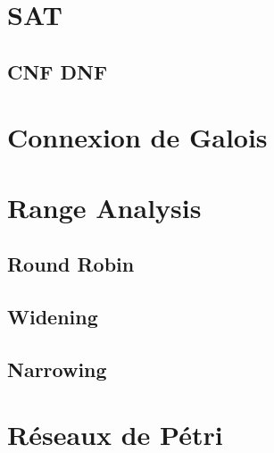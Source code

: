 \documentclass{article}
\begin{document}
  \section{SAT}
  \subsection{CNF DNF}

  \section{Connexion de Galois}
  \subsection{}

  \section{Range Analysis}
  \subsection{Round Robin}
  \subsection{Widening}
  \subsection{Narrowing}

  \section{Réseaux de Pétri}
\end{document}
